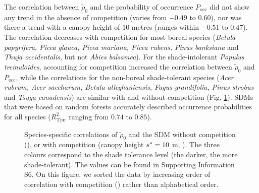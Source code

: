 The correlation between $ \tilde \rho_0 $ and the probability of occurrence $ P_{\text{occ}} $ did not show any trend in the absence of competition (varies from $ - 0.49 $ to $ 0.60 $), nor was there a trend with a canopy height of $ 10 $ metres (ranges within $ - 0.51 $ to $ 0.47 $). The correlation decreases with competition for most boreal species (\textit{Betula papyrifera, Picea glauca, Picea mariana, Picea rubens, Pinus banksiana} and \textit{Thuja occidentalis}, but not \textit{Abies balsamea}). For the shade-intolerant \textit{Populus tremuloides}, accounting for competition increased the correlation between $ \tilde \rho_0 $ and $ P_{\text{occ}} $, while the correlations for the non-boreal shade-tolerant species (\textit{Acer rubrum, Acer saccharum, Betula alleghaniensis, Fagus grandifolia, Pinus strobus} and \textit{Tsuga canadensis}) are similar with and without competition (Fig. \ref{fig::3correls}). SDMs that were based on random forests accurately described occurrence probabilities for all species ($ R_{\text{Tjur}}^2 $ ranging from $ 0.74 $ to $ 0.85 $).
\begin{figure}
	\centering
	
	\caption{Species-specific correlations of $ \tilde \rho_0 $ and the SDM without competition (\MoveUp), or with competition (canopy height $ {s}^{*} = 10 $ m, \CircSteel). The three colours correspond to the shade tolerance level (the darker, the more shade-tolerant). The values can be found in Supporting Information S6. On this figure, we sorted the data by increasing order of correlation with competition (\CircSteel) rather than alphabetical order. \label{fig::3correls}}
\end{figure}

